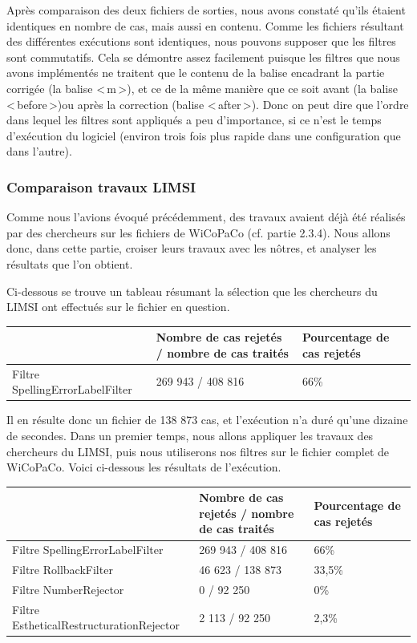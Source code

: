 \documentclass[11pt]{article}
\begin{document}
Apr\`{e}s comparaison des deux fichiers de sorties, nous avons constat\'{e} qu'ils \'{e}taient identiques en nombre de cas, mais aussi en contenu. Comme les fichiers r\'{e}sultant des diff\'{e}rentes ex\'{e}cutions sont identiques, nous pouvons supposer que les filtres sont commutatifs.
Cela se d\'{e}montre assez facilement puisque les filtres que nous avons impl\'{e}ment\'{e}s ne traitent que le contenu de la balise encadrant la partie corrig\'{e}e (la balise <\,m\,>), et ce de la m\^{e}me mani\`{e}re que ce soit avant (la balise <\,before\,>)ou apr\`{e}s la correction (balise <\,after\,>). Donc on peut dire que l'ordre dans lequel les filtres sont appliqu\'{e}s a peu d'importance, si ce n'est le temps d'ex\'{e}cution du logiciel (environ trois fois plus rapide dans une configuration que dans l'autre).


\subsubsection{Comparaison travaux LIMSI}
Comme nous l'avions \'{e}voqu\'{e} pr\'{e}c\'{e}demment, des travaux avaient d\'{e}j\`{a} \'{e}t\'{e} r\'{e}alis\'{e}s par des chercheurs sur les fichiers de WiCoPaCo (cf. partie 2.3.4). Nous allons donc, dans cette partie, croiser leurs travaux avec les n\^{o}tres, et analyser les r\'{e}sultats que l'on obtient.

Ci-dessous se trouve un tableau r\'{e}sumant la s\'{e}lection que les chercheurs du LIMSI ont effectu\'{e}s sur le fichier en question.
\begin{center}
\begin{tabular}{|M{4cm}|M{5cm}|M{6cm}|}
   \hline
    \, &Nombre de cas rejet\'{e}s / nombre de cas trait\'{e}s & Pourcentage de cas rejet\'{e}s \tabularnewline
   \hline
    Filtre SpellingErrorLabelFilter & 269 943 / 408 816 & 66\% \tabularnewline
   \hline
\end{tabular}
\end{center}
Il en r\'{e}sulte donc un fichier de 138 873 cas, et l'ex\'{e}cution n'a dur\'{e} qu'une dizaine de secondes.
\newline
\newline
Dans un premier temps, nous allons appliquer les travaux des chercheurs du LIMSI, puis nous utiliserons nos filtres sur le fichier complet de WiCoPaCo.
Voici ci-dessous les r\'{e}sultats de l'ex\'{e}cution.

\begin{center}
\begin{tabular}{|M{6cm}|M{5cm}|M{6cm}|}
   \hline
    \, &Nombre de cas rejet\'{e}s / nombre de cas trait\'{e}s & Pourcentage de cas rejet\'{e}s \tabularnewline
    \hline
    Filtre SpellingErrorLabelFilter & 269 943 / 408 816 & 66\% \tabularnewline
   \hline
       Filtre RollbackFilter & 46 623 / 138 873 & 33,5\% \tabularnewline
 \hline
    Filtre NumberRejector & 0 / 92 250 & 0\% \tabularnewline
\hline
Filtre EstheticalRestructurationRejector & 2 113 / 92 250 & 2,3\% \tabularnewline
\hline
\end{tabular}
\end{center}
\end{document}
